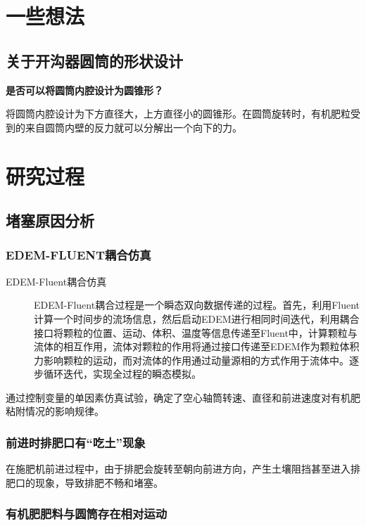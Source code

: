 \documentclass[fontset=windows]{ctexart}
\begin{document}
\section{一些想法}

\subsection{关于开沟器圆筒的形状设计}

\textbf{是否可以将圆筒内腔设计为圆锥形？}

将圆筒内腔设计为下方直径大，上方直径小的圆锥形。在圆筒旋转时，有机肥粒受到的来自圆筒内壁的反力就可以分解出一个向下的力。

\section{研究过程}

\subsection{堵塞原因分析}

\subsubsection{EDEM-FLUENT耦合仿真}

\begin{description}
	\item[EDEM-Fluent耦合仿真]

	EDEM-Fluent耦合过程是一个瞬态双向数据传递的过程。首先，利用Fluent计算一个时间步的流场信息，然后启动EDEM进行相同时间迭代，利用耦合接口将颗粒的位置、运动、体积、温度等信息传递至Fluent中，计算颗粒与流体的相互作用，流体对颗粒的作用将通过接口传递至EDEM作为颗粒体积力影响颗粒的运动，而对流体的作用通过动量源相的方式作用于流体中。逐步循环迭代，实现全过程的瞬态模拟。
\end{description}

通过控制变量的单因素仿真试验，确定了空心轴筒转速、直径和前进速度对有机肥粘附情况的影响规律。

\subsubsection{前进时排肥口有“吃土”现象}

在施肥机前进过程中，由于排肥会旋转至朝向前进方向，产生土壤阻挡甚至进入排肥口的现象，导致排肥不畅和堵塞。

\subsubsection{有机肥肥料与圆筒存在相对运动}
\end{document}
